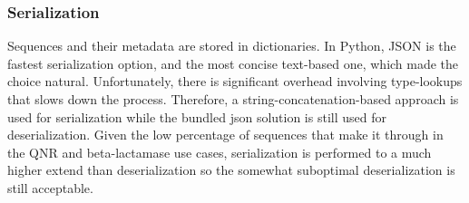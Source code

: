 \documentclass[a4paper,12pt]{article}
\begin{document}
\subsubsection{Serialization}
Sequences and their metadata are stored in dictionaries. In Python, JSON is the fastest serialization option, and the most concise text-based one, which made the choice natural. Unfortunately, there is significant overhead involving type-lookups that slows down the process. Therefore, a string-concatenation-based approach is used for serialization while the bundled json solution is still used for deserialization. Given the low percentage of sequences that make it through in the QNR and beta-lactamase use cases, serialization is performed to a much higher extend than deserialization so the somewhat suboptimal deserialization is still acceptable.

\printbibliography
\end{document}
